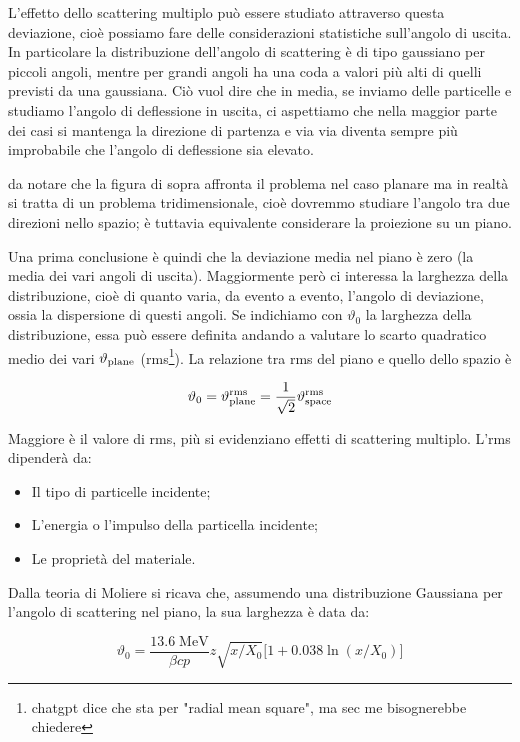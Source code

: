 \vspace{0.2cm}L'effetto dello scattering multiplo può essere studiato attraverso questa deviazione, cioè possiamo fare delle considerazioni statistiche sull'angolo di uscita. In particolare la distribuzione dell'angolo di scattering è di tipo gaussiano per piccoli angoli, mentre per grandi angoli ha una coda a valori più alti di quelli previsti da una gaussiana. Ciò vuol dire che in media, se inviamo delle particelle e studiamo l'angolo di deflessione in uscita, ci aspettiamo che nella maggior parte dei casi si mantenga la direzione di partenza e via via diventa sempre più improbabile che l'angolo di deflessione sia elevato.

\E da notare che la figura di sopra affronta il problema nel caso planare ma in realtà si tratta di un problema tridimensionale, cioè dovremmo studiare l'angolo tra due direzioni nello spazio; è tuttavia equivalente considerare la proiezione su un piano.

Una prima conclusione è quindi che la deviazione media nel piano è zero (la media dei vari angoli di uscita). Maggiormente però ci interessa la larghezza della distribuzione, cioè di quanto varia, da evento a evento, l'angolo di deviazione, ossia la dispersione di questi angoli. Se indichiamo con $\vartheta_0$ la larghezza della distribuzione, essa può essere definita andando a valutare lo scarto quadratico medio dei vari $\vartheta_{\rm plane}$ (rms\footnote{chatgpt dice che sta per "radial mean square", ma sec me bisognerebbe chiedere}). La relazione tra rms del piano e quello dello spazio è

$$\vartheta_0=\vartheta_{\rm plane}^{\rm rms}
=\frac{1}{\sqrt{2}} \vartheta_{\rm space}^{\rm rms}$$

Maggiore è il valore di rms, più si evidenziano effetti di scattering multiplo. L'rms dipenderà da:

\begin{itemize}
    \item Il tipo di particelle incidente;
    \item L'energia o l'impulso della particella incidente;
    \item Le proprietà del materiale.
\end{itemize}

Dalla teoria di Moliere si ricava che, assumendo una distribuzione Gaussiana per l'angolo di scattering nel piano, la sua larghezza è data da:

$$\vartheta_0=\frac{13.6 \; \text{MeV}}{\beta c p} z \sqrt{x/X_0} \big[ 1 + 0.038 \ln(x/X_0) \big]$$

